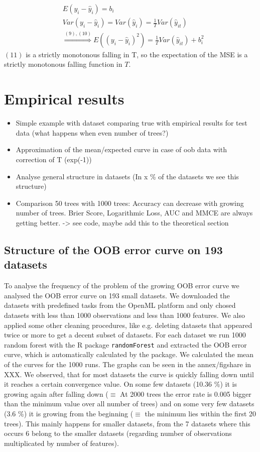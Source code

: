 \documentclass[paper=a4
               ,12pt
               ,DIV=12
               ,parskip=half
               ,titlepage=on
               ,headinclude 
               ,footinclude
               ,headsepline
               ,footsepline         %
               ,ilines 
               ]{scrartcl}
\begin{document}
 \begin{align}
& E(y_i - \hat{y}_i) = b_i \\
& Var(y_i - \hat{y}_i)  = Var(\hat{y}_i) = \frac{1}{T} Var(\hat{y}_{it}) \\
& \stackrel{(9), (10)}{\Rightarrow} E((y_i - \hat{y}_i) ^ 2) = \frac{1}{T} Var(\hat{y}_{it}) + b_i^2
\end{align}
$(11)$ is a strictly monotonous falling in T, so the expectation of the MSE is a strictly monotonous falling function in $T$. 


\section{Empirical results}

\begin{itemize}
 \item Simple example with dataset comparing true with empirical results for test data (what happens when even number of trees?)
 \item Approximation of the mean/expected curve in case of oob data with correction of T (exp(-1))
 \item Analyse general structure in datasets (In x \% of the datasets we see this structure)
 \item Comparison 50 trees with 1000 trees: Accuracy can decrease with growing number of trees.
Brier Score, Logarithmic Loss, AUC and MMCE are always getting better. -> see code, maybe add this to the theoretical section
\end{itemize}

\subsection{Structure of the OOB error curve on 193 datasets}

To analyse the frequency of the problem of the growing OOB error curve we analysed the OOB error curve on 193 small datasets. We downloaded the datasets with predefined 
tasks from the OpenML platform and only chosed datasets with less than 1000 observations and less than 1000 features. We also applied some other cleaning procedures, like e.g. 
deleting datasets that appeared twice or more to get a decent subset of datasets. 
For each dataset we run 1000 random forest with the R package \texttt{randomForest} \citep{Liaw2002} and extracted the OOB error curve, which is automatically calculated by the package. 
We calculated the mean of the curves for the 1000 runs. The graphs can be seen in the annex/figshare in XXX. 
We observed, that for most datasets the curve is quickly falling down until it reaches a certain convergence value. On some few datasets (10.36 \%) it is growing again after falling down ($\equiv$ At 2000 trees the error rate is 0.005 bigger than 
the minimum value over all number of trees) and on some very few datasets (3.6 \%) it is growing from the beginning ($\equiv$ the minimum lies within the first 20 trees). This mainly happens for smaller datasets, 
from the 7 datasets where this occurs 6 belong to the smaller datasets (regarding number of observations multiplicated by number of features). 
\end{document}
